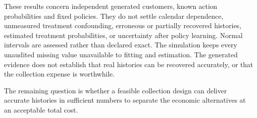 These results concern independent generated customers, known action
probabilities and fixed policies. They do not settle calendar dependence,
unmeasured treatment confounding, erroneous or partially recovered histories,
estimated treatment probabilities, or uncertainty after policy learning.
Normal intervals are assessed rather than declared exact. The simulation
keeps every unaudited missing value unavailable to fitting and estimation.
The generated evidence does not establish that real histories can be
recovered accurately, or that the collection expense is worthwhile.

The remaining question is whether a feasible collection design can deliver
accurate histories in sufficient numbers to separate the economic
alternatives at an acceptable total cost.
